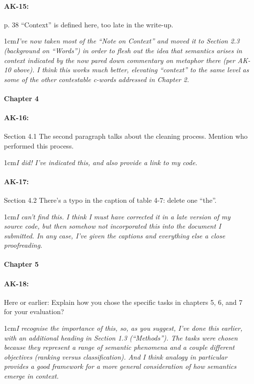 \documentclass[11pt,a4paper]{article}
\newcommand{\res}[1]{\vspace{0.25cm} \begin{adjustwidth}{1cm}{}\emph{#1}\end{adjustwidth}}
\begin{document}
\paragraph{AK-15:} p. 38 “Context” is defined here, too late in the write-up.

\res{I've now taken most of the ``Note on Context'' and moved it to Section 2.3 (background on ``Words'') in order to flesh out the idea that semantics arises in context indicated by the now pared down commentary on metaphor there (per AK-10 above).  I think this works much better, elevating ``context'' to the same level as some of the other contestable c-words addressed in Chapter 2.}

\paragraph{Chapter 4}

\paragraph{AK-16:} Section 4.1 The second paragraph talks about the cleaning process. Mention who performed this process.

\res{I did!  I've indicated this, and also provide a link to my code.}

\paragraph{AK-17:} Section 4.2 There’s a typo in the caption of table 4-7: delete one ``the''.

\res{I can't find this.  I think I must have corrected it in a late version of my source code, but then somehow not incorporated this into the document I submitted.  In any case, I've given the captions and everything else a close proofreading.}

\paragraph{Chapter 5}

\paragraph{AK-18:} Here or earlier: Explain how you chose the specific tasks in chapters 5, 6, and 7 for your evaluation?

\res{I recognise the importance of this, so, as you suggest, I've done this earlier, with an additional heading in Section 1.3 (``Methods'').  The tasks were chosen because they represent a range of semantic phenomena and a couple different objectives (ranking versus classification).  And I think analogy in particular provides a good framework for a more general consideration of how semantics emerge in context.}
\end{document}
